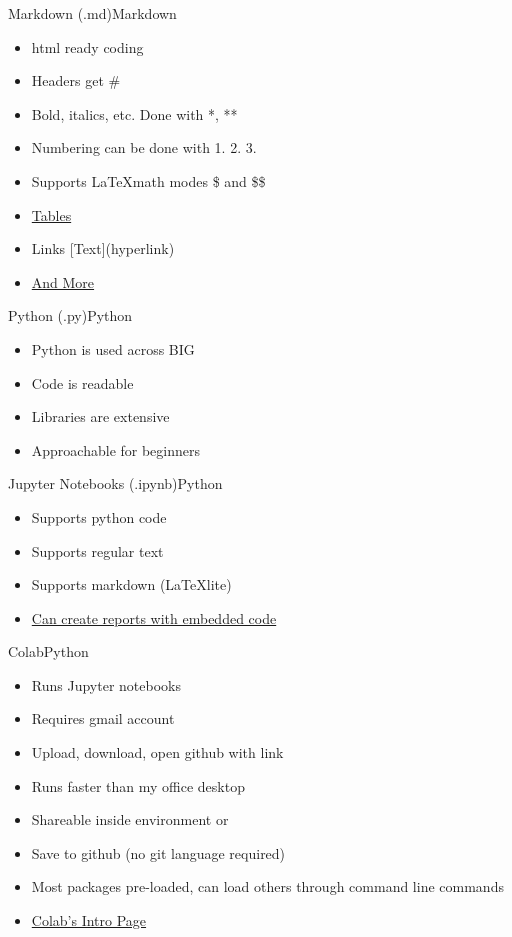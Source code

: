 \documentclass[xcolor=pdftex,dvipsnames,table]{beamer}
\begin{document}
\begin{frame}{Markdown (.md)}{Markdown}
\begin{itemize}
\item html ready coding \pause
\item Headers get \# \pause
\item Bold, italics, etc. Done with *, ** \pause
\item Numbering can be done with 1. 2. 3. \pause
\item Supports \LaTeX math modes \$ and \$\$ \pause
\item \href{https://www.tablesgenerator.com/markdown_tables}{Tables} \pause
\item Links [Text](hyperlink) \pause
\item \href{https://www.markdownguide.org/cheat-sheet/}{And More}
\end{itemize}
\end{frame}

\begin{frame}{Python (.py)}{Python}
\begin{itemize}
\item Python is used across BIG\pause
\item Code is readable\pause
\item Libraries are extensive\pause
\item Approachable for beginners
\end{itemize}
\end{frame}

\begin{frame}{Jupyter Notebooks (.ipynb)}{Python}
\begin{itemize}
\item Supports python code  \pause
\item Supports regular text \pause
\item Supports markdown (\LaTeX lite) \pause
\item \href{https://colab.research.google.com/github/nurfnick/Numerical_Methods/blob/master/ProjectPart3.ipynb}{Can create reports with embedded code}
\end{itemize}
\end{frame}
\begin{frame}{Colab}{Python}
\begin{itemize}
\item Runs Jupyter notebooks \pause
\item Requires gmail account \pause
\item Upload, download, open github with link  \pause
\item Runs faster than my office desktop  \pause
\item Shareable inside environment or \pause
\item Save to github (no git language required)  \pause
\item Most packages pre-loaded, can load others through command line commands  \pause
\item \href{https://colab.research.google.com/notebooks/intro.ipynb}{Colab\rq{}s Intro Page}
\end{itemize}

\end{frame}
\end{document}
